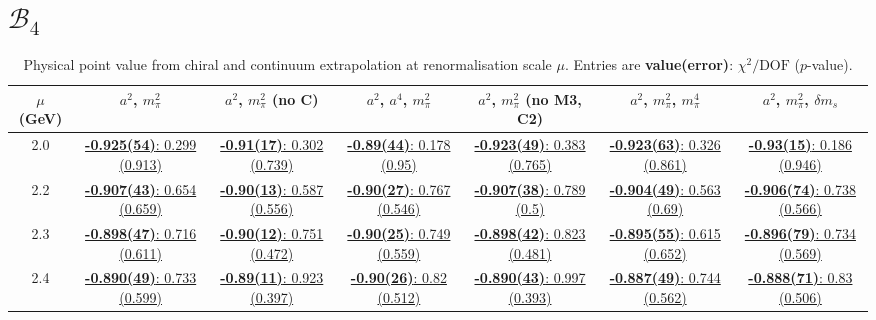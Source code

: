 \documentclass[12pt]{extarticle}
\begin{document}
\section{$\mathcal{B}_4$}
\begin{table}[h!]
\begin{center}
\begin{tabular}{|c|c|c|c|c|c|c|}
\hline
$\mu$ (GeV) & $a^2$, $m_\pi^2$& $a^2$, $m_\pi^2$ (no C)& $a^2$, $a^4$, $m_\pi^2$& $a^2$, $m_\pi^2$ (no M3, C2)& $a^2$, $m_\pi^2$, $m_\pi^4$& $a^2$, $m_\pi^2$, $\delta m_s$\\
\hline
2.0& \hyperlink{SSpPP/NPR/a2m2_20.pdf.1}{\textbf{-0.925(54)}: 0.299 (0.913)} & \hyperlink{SSpPP/NPR/a2m2noC_20.pdf.1}{\textbf{-0.91(17)}: 0.302 (0.739)} & \hyperlink{SSpPP/NPR/a2a4m2_20.pdf.1}{\textbf{-0.89(44)}: 0.178 (0.95)} & \hyperlink{SSpPP/NPR/a2m2mcut_20.pdf.1}{\textbf{-0.923(49)}: 0.383 (0.765)} & \hyperlink{SSpPP/NPR/a2m2m4_20.pdf.1}{\textbf{-0.923(63)}: 0.326 (0.861)} & \hyperlink{SSpPP/NPR/a2m2delm_20.pdf.1}{\textbf{-0.93(15)}: 0.186 (0.946)}\\
2.2& \hyperlink{SSpPP/NPR/a2m2_22.pdf.1}{\textbf{-0.907(43)}: 0.654 (0.659)} & \hyperlink{SSpPP/NPR/a2m2noC_22.pdf.1}{\textbf{-0.90(13)}: 0.587 (0.556)} & \hyperlink{SSpPP/NPR/a2a4m2_22.pdf.1}{\textbf{-0.90(27)}: 0.767 (0.546)} & \hyperlink{SSpPP/NPR/a2m2mcut_22.pdf.1}{\textbf{-0.907(38)}: 0.789 (0.5)} & \hyperlink{SSpPP/NPR/a2m2m4_22.pdf.1}{\textbf{-0.904(49)}: 0.563 (0.69)} & \hyperlink{SSpPP/NPR/a2m2delm_22.pdf.1}{\textbf{-0.906(74)}: 0.738 (0.566)}\\
2.3& \hyperlink{SSpPP/NPR/a2m2_23.pdf.1}{\textbf{-0.898(47)}: 0.716 (0.611)} & \hyperlink{SSpPP/NPR/a2m2noC_23.pdf.1}{\textbf{-0.90(12)}: 0.751 (0.472)} & \hyperlink{SSpPP/NPR/a2a4m2_23.pdf.1}{\textbf{-0.90(25)}: 0.749 (0.559)} & \hyperlink{SSpPP/NPR/a2m2mcut_23.pdf.1}{\textbf{-0.898(42)}: 0.823 (0.481)} & \hyperlink{SSpPP/NPR/a2m2m4_23.pdf.1}{\textbf{-0.895(55)}: 0.615 (0.652)} & \hyperlink{SSpPP/NPR/a2m2delm_23.pdf.1}{\textbf{-0.896(79)}: 0.734 (0.569)}\\
2.4& \hyperlink{SSpPP/NPR/a2m2_24.pdf.1}{\textbf{-0.890(49)}: 0.733 (0.599)} & \hyperlink{SSpPP/NPR/a2m2noC_24.pdf.1}{\textbf{-0.89(11)}: 0.923 (0.397)} & \hyperlink{SSpPP/NPR/a2a4m2_24.pdf.1}{\textbf{-0.90(26)}: 0.82 (0.512)} & \hyperlink{SSpPP/NPR/a2m2mcut_24.pdf.1}{\textbf{-0.890(43)}: 0.997 (0.393)} & \hyperlink{SSpPP/NPR/a2m2m4_24.pdf.1}{\textbf{-0.887(49)}: 0.744 (0.562)} & \hyperlink{SSpPP/NPR/a2m2delm_24.pdf.1}{\textbf{-0.888(71)}: 0.83 (0.506)}\\
\hline
\end{tabular}
\caption{Physical point value from chiral and continuum extrapolation at renormalisation scale $\mu$. Entries are \textbf{value(error)}: $\chi^2/\text{DOF}$ ($p$-value).}
\end{center}
\end{table}
\end{document}

